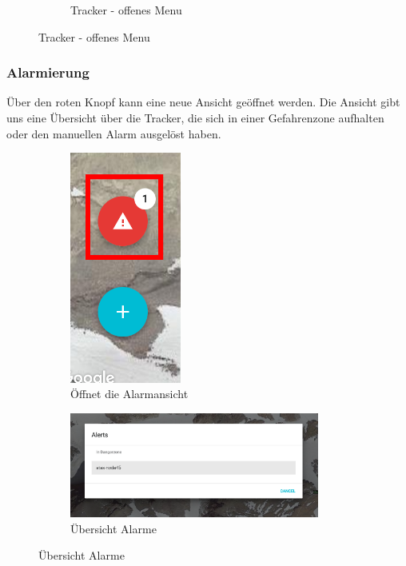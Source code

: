 \documentclass[11pt,english,german]{report}
\theoremstyle{definition}
\begin{document}
\begin{figure}[H]
\begin{subfigure}{.45\textwidth}
		\caption[Tracker - offenes Menu]
		{Tracker - offenes Menu}
	\end{subfigure}%
\end{figure}

\subsubsection{Alarmierung}
Über den roten Knopf kann eine neue Ansicht geöffnet werden. Die Ansicht gibt uns eine Übersicht über die Tracker, die sich in einer Gefahrenzone aufhalten oder den manuellen Alarm ausgelöst haben.
\begin{figure}[H]
	\centering
	\begin{subfigure}{.3\textwidth}
		\centering
		\includegraphics[width=0.4\textwidth]{img/atasweb/atas-web-alertbutton.png}
		\caption[Knopf zum öffnen der Alarmansicht]
		{Öffnet die Alarmansicht}
	\end{subfigure}%
	\begin{subfigure}{.65\textwidth}
		\centering
		\includegraphics[width=0.9\textwidth]{img/atasweb/atas-web-alertoverview.png}
		\caption[Übersicht Alarme]
		{Übersicht Alarme}
	\end{subfigure}%
\end{figure}
\end{document}
